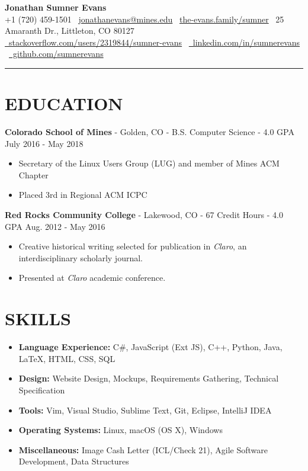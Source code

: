 \documentclass[10.5pt,letterpaper]{article}
\begin{document}
\begin{center}
    \huge\textbf{Jonathan Sumner Evans} \\
    \vspace{3pt}
    \small +1 (720) 459-1501
    \textbar\ \href{mailto:jonathanevans@mines.edu}{jonathanevans@mines.edu}
    \textbar\ \href{http://the-evans.family/sumner}{the-evans.family/sumner}
    \textbar\ 25 Amaranth Dr., Littleton, CO 80127 \\
    \href{http://stackoverflow.com/users/2319844/sumner-evans}{\faStackOverflow\
    stackoverflow.com/users/2319844/sumner-evans}
    \textbar\ \href{https://www.linkedin.com/in/sumnerevans}{\faLinkedin\
    linkedin.com/in/sumnerevans}
    \textbar\ \href{https://github.com/sumnerevans}{\faGithub\
    github.com/sumnerevans}
    \rule{\textwidth}{0.5pt}
\end{center}

\section*{EDUCATION}
\textbf{Colorado School of Mines} - Golden, CO - B.S. Computer Science - 4.0 GPA
\hfill July 2016 - May 2018
\begin{itemize}
    \item Secretary of the Linux Users Group (LUG) and member of Mines ACM
        Chapter
    \item Placed 3rd in Regional ACM ICPC
\end{itemize}

\vspace{4pt}
\textbf{Red Rocks Community College} - Lakewood, CO - 67 Credit Hours - 4.0 GPA
\hfill Aug. 2012 - May 2016
\begin{itemize}
    \item Creative historical writing selected for publication in
        \textit{Claro}, an interdisciplinary scholarly journal.
    \item Presented at \textit{Claro} academic conference.
\end{itemize}

\section*{SKILLS}
{
    \renewcommand\labelitemi{}
    \renewcommand\leftmargini{0pt}
    \begin{itemize}
        \item \textbf{Language Experience:} C\#, JavaScript (Ext JS), C++,
            Python, Java, \LaTeX, HTML, CSS, SQL
        \item \textbf{Design:} Website Design, Mockups, Requirements Gathering,
            Technical Specification
        \item \textbf{Tools:} Vim, Visual Studio, Sublime Text, Git, Eclipse,
            IntelliJ IDEA
        \item \textbf{Operating Systems:} Linux, macOS (OS X), Windows
        \item \textbf{Miscellaneous:} Image Cash Letter (ICL/Check 21), Agile
            Software Development, Data Structures
    \end{itemize}
}
\end{document}

